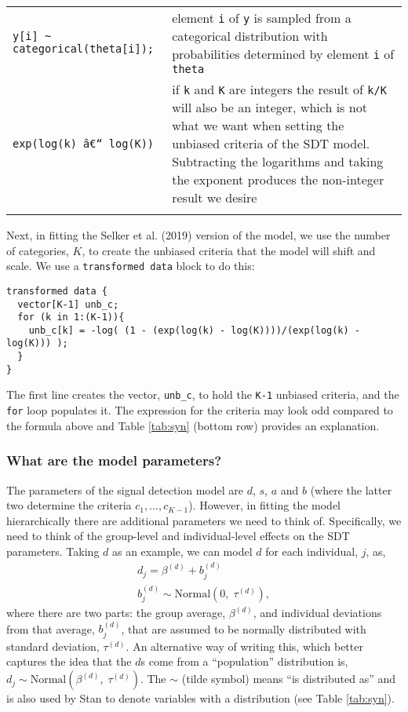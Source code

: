 \documentclass[
  english,
  ,man,floatsintext]{apa6}
\begin{document}
\begin{table}[!h]
{\begin{tabular}{p{}p{}}
  \texttt{y[i] \textasciitilde{} categorical(theta[i]);} & element \texttt{i} of \texttt{y} is sampled from a categorical distribution with probabilities determined by element \texttt{i} of \texttt{theta} \\ 
  \texttt{exp(log(k) â€“ log(K))} & if \texttt{k} and \texttt{K} are integers the result of \texttt{k\slash K} will also be an integer, which is not what we want when setting the unbiased criteria of the SDT model. Subtracting the logarithms and taking the exponent produces the non-integer result we desire \\ 
   \bottomrule \\ \end{tabular}
}
\end{table}

Next, in fitting the Selker et al. (2019) version of the model, we use the number of categories, \(K\), to create the unbiased criteria that the model will shift and scale. We use a \texttt{transformed\ data} block to do this:

\begin{verbatim}
transformed data {
  vector[K-1] unb_c;
  for (k in 1:(K-1)){
    unb_c[k] = -log( (1 - (exp(log(k) - log(K))))/(exp(log(k) - log(K))) );
  }
}
\end{verbatim}

The first line creates the vector, \texttt{unb\_c}, to hold the \texttt{K-1} unbiased criteria, and the \texttt{for} loop populates it. The expression for the criteria may look odd compared to the formula above and Table \ref{tab:syn} (bottom row) provides an explanation.

\hypertarget{what-are-the-model-parameters}{%
\subsubsection{What are the model parameters?}\label{what-are-the-model-parameters}}

The parameters of the signal detection model are \(d\), \(s\), \(a\) and \(b\) (where the latter two determine the criteria \(c_{1}, \ldots, c_{K-1}\)). However, in fitting the model hierarchically there are additional parameters we need to think of. Specifically, we need to think of the group-level and individual-level effects on the SDT parameters. Taking \(d\) as an example, we can model \(d\) for each individual, \(j\), as,
\[
\begin{aligned}
d_{j} = \beta^{(d)} + b^{(d)}_{j} \\
b^{(d)}_{j} \sim \mbox{Normal}(0, \; \tau^{(d)}),
\end{aligned}
\]
where there are two parts: the group average, \(\beta^{(d)}\), and individual deviations from that average, \(b^{(d)}_{j}\), that are assumed to be normally distributed with standard deviation, \(\tau^{(d)}\). An alternative way of writing this, which better captures the idea that the \(d\)s come from a \enquote{population} distribution is, \(d_j \sim \mbox{Normal}(\beta^{(d)}, \; \tau^{(d)})\). The \(\sim\) (tilde symbol) means \enquote{is distributed as} and is also used by Stan to denote variables with a distribution (see Table \ref{tab:syn}).
\end{document}
